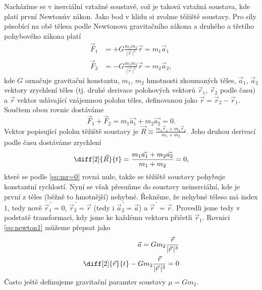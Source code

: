 \documentclass[A4paper, 12pt, oneside]{book}
\newcommand{\ap}{{\,\prime}}
\newcommand{\abs}[1]{\lvert #1 \,\rvert}
\begin{document}
Nacházíme se v inerciální vztažné soustavě, což je taková vztažná soustava, kde platí první Newtonův zákon. Jako bod v klidu si zvolme těžiště soustavy. Pro síly působící na obě tělesa podle Newtonova gravitačního zákona a druhého a třetího pohybového zákona platí
\begin{align} 
	\vec{F}_1 &= +G\frac{m_1m_2}{\abs{\vec{r}}^3}\vec{r} = m_1\vec{a}_1 \label{eq:newton1} \\
	\vec{F}_2 &= -G\frac{m_1m_2}{\abs{\vec{r}}^3}\vec{r} = m_2\vec{a}_2, \label{eq:newton2}
\end{align}
kde $G$ označuje gravitační konstantu, $m_1$, $m_2$ hmotnosti zkoumaných těles, $\vec{a}_1$, $\vec{a}_2$ vektory zrychlení těles (tj. druhé derivace polohových vektorů $\vec{r}_1$, $\vec{r}_2$ podle času) a $\vec{r}$ vektor udávající vzájemnou polohu těles, definovanou jako $\vec{r} = \vec{r}_2 - \vec{r}_1$. Součtem obou rovnic dostáváme
\begin{equation} \label{eq:mr=0}
	\vec{F}_1 + \vec{F}_2 = m_1\vec{a_1} + m_2\vec{a_2} = 0.
\end{equation}
Vektor popisující polohu těžiště soustavy je $\vec{R} \equiv \frac{m_1\vec{r}_1 + m_2\vec{r}_2}{m_1 + m_2}$. Jeho druhou derivací podle času dostáváme zrychlení
\begin{equation*}
	\diff[2]{\vec{R}}{t} = \frac{m_1\vec{a_1} + m_2\vec{a_2}}{m_1+m_2} = 0,
\end{equation*}
které se podle \eqref{eq:mr=0} rovná nule, takže se těžiště soustavy pohybuje konstantní rychlostí.
\newpage
Nyní se však přesuňme do soustavy neinerciální, kde je první z těles (běžně to hmotnější) nehybné. Řekněme, že nehybné těleso má index $1$, tedy nově $\vec{r}^\ap_1=0$, $\vec{r}^\ap_2=\vec{r}$ (tedy i $\vec{a}^\ap_2 = \vec{a}$) a $\vec{r}^\ap=\vec{r}$. Provedli jsme tedy v podstatě transformaci, kdy jsme ke každému vektoru přičetli $\vec{r}_1$.  Rovnici \eqref{eq:newton1} můžeme přepsat jako
\begin{align}
	\nonumber {\vec{a}} = Gm_2\frac{\vec{r}}{\abs{\vec{r}}^3} \\
		\diff[2]{\vec{r}}{t} - Gm_2\frac{\vec{r}}{\abs{\vec{r}}^3} = 0	
\end{align}
Často ještě definujeme gravitační paramter soustavy $\mu=Gm_2$.
\end{document}
